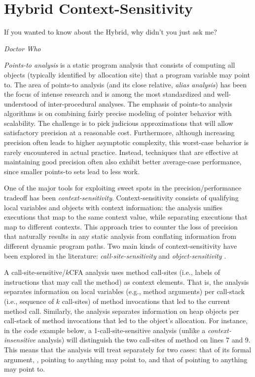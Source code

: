 \chapter{Hybrid Context-Sensitivity}\label{chapter:hybrid}

\epigraph{If you wanted to know about the Hybrid, why didn’t you just ask me?}{\textit{Doctor Who}}

\emph{Points-to analysis} is a static program analysis that consists
of computing all objects (typically identified by allocation site)
that a program variable may point to. The area of points-to analysis
(and its close relative, \emph{alias analysis}) has been the focus of
intense research and is among the most standardized and
well-understood of inter-procedural analyses. The emphasis of
points-to analysis algorithms is on combining fairly precise modeling
of pointer behavior with scalability. The challenge is to pick
judicious approximations that will allow satisfactory precision at a
reasonable cost. Furthermore, although increasing precision often
leads to higher asymptotic complexity, this worst-case behavior is
rarely encountered in actual practice. Instead, techniques that are
effective at maintaining good precision often also exhibit better
average-case performance, since smaller points-to sets lead to less
work.

One of the major tools for exploiting sweet spots in the
precision/performance tradeoff has been \emph{context-sensitivity}.
Context-sensitivity consists of qualifying local variables and objects
with context information: the analysis unifies executions that map to
the same context value, while separating executions that map to
different contexts. This approach tries to counter the loss of
precision that naturally results in any static analysis from
conflating information from different dynamic program paths. Two main
kinds of context-sensitivity have been explored in the literature:
\emph{call-site-sensitivity}
\cite{Sharir:Interprocedural,Shivers:1991:diss} and
\emph{object-sensitivity}
\cite{Milanova:2002:POS:566172.566174,1044835,pointsto-popl11}.

A call-site-sensitive/$k$CFA analysis uses method call-sites (i.e.,
labels of instructions that may call the method) as context elements.
That is, the analysis separates information on local variables (e.g.,
method arguments) per call-stack (i.e., sequence of $k$ call-sites) of
method invocations that led to the current method call. Similarly, the
analysis separates information on heap objects per call-stack of
method invocations that led to the object's allocation. For instance,
in the code example below, a 1-call-site-sensitive analysis (unlike a
\emph{context-insensitive} analysis) will distinguish the two
call-sites of method  on lines 7 and 9. This means that the
analysis will treat  separately for two cases: that of its
formal argument, , pointing to anything  may point to, and
that of  pointing to anything  may point to.


